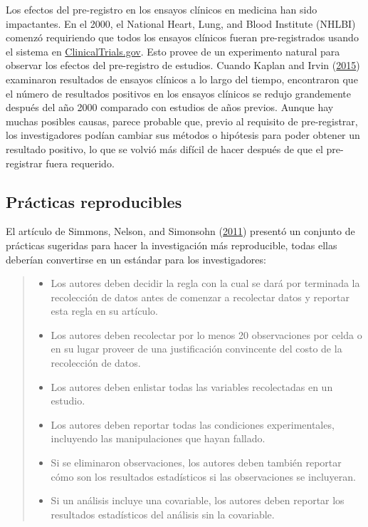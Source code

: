 \documentclass[
  12pt,
]{book}
\providecommand{\tightlist}{%
  \setlength{\itemsep}{0pt}\setlength{\parskip}{0pt}}
\begin{document}
Los efectos del pre-registro en los ensayos clínicos en medicina han sido impactantes. En el 2000, el National Heart, Lung, and Blood Institute (NHLBI) comenzó requiriendo que todos los ensayos clínicos fueran pre-registrados usando el sistema en \href{http://clinicaltrials.gov}{ClinicalTrials.gov}. Esto provee de un experimento natural para observar los efectos del pre-registro de estudios. Cuando Kaplan and Irvin (\protect\hyperlink{ref-kapl:irvi:2015}{2015}) examinaron resultados de ensayos clínicos a lo largo del tiempo, encontraron que el número de resultados positivos en los ensayos clínicos se redujo grandemente después del año 2000 comparado con estudios de años previos. Aunque hay muchas posibles causas, parece probable que, previo al requisito de pre-registrar, los investigadores podían cambiar sus métodos o hipótesis para poder obtener un resultado positivo, lo que se volvió más difícil de hacer después de que el pre-registrar fuera requerido.

\hypertarget{pruxe1cticas-reproducibles}{%
\subsection{Prácticas reproducibles}\label{pruxe1cticas-reproducibles}}

El artículo de Simmons, Nelson, and Simonsohn (\protect\hyperlink{ref-simm:nels:simo:2011}{2011}) presentó un conjunto de prácticas sugeridas para hacer la investigación más reproducible, todas ellas deberían convertirse en un estándar para los investigadores:

\begin{quote}
\begin{itemize}
\tightlist
\item
  Los autores deben decidir la regla con la cual se dará por terminada la recolección de datos antes de comenzar a recolectar datos y reportar esta regla en su artículo.
\item
  Los autores deben recolectar por lo menos 20 observaciones por celda o en su lugar proveer de una justificación convincente del costo de la recolección de datos.
\item
  Los autores deben enlistar todas las variables recolectadas en un estudio.
\item
  Los autores deben reportar todas las condiciones experimentales, incluyendo las manipulaciones que hayan fallado.
\item
  Si se eliminaron observaciones, los autores deben también reportar cómo son los resultados estadísticos si las observaciones se incluyeran.
\item
  Si un análisis incluye una covariable, los autores deben reportar los resultados estadísticos del análisis sin la covariable.
\end{itemize}
\end{quote}
\end{document}

